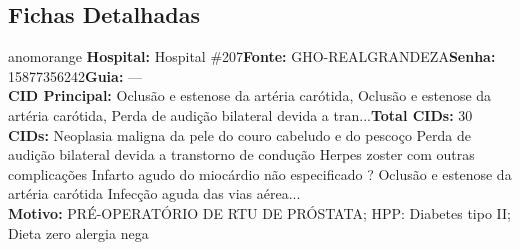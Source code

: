 \documentclass[a4paper,10pt]{article}
\begin{document}
\subsection{Fichas Detalhadas}
\begin{anomalycard}[Interna\c{c}\~{a}o \#11960 | Pac. \#8588 | ALTO (z=4.44) | LOS: 2d | 25/02/2026\,$\to$\,27/02/2026]{anomorange}
\textbf{Hospital:} Hospital \#207\quad \textbf{Fonte:} GHO-REALGRANDEZA\quad \textbf{Senha:} 15877356242\quad \textbf{Guia:} ---\\

\textbf{CID Principal:} {\small Oclusão e estenose da artéria carótida, Oclusão e estenose da artéria carótida, Perda de audição bilateral devida a tran...}\quad\textbf{Total CIDs:} 30\\

\textbf{CIDs:} {\scriptsize Neoplasia maligna da pele do couro cabeludo e do pescoço \textbar{} Perda de audição bilateral devida a transtorno de condução \textbar{} Herpes zoster com outras complicações \textbar{} Infarto agudo do miocárdio não especificado \textbar{} ? \textbar{} Oclusão e estenose da artéria carótida \textbar{} Infecção aguda das vias aérea...}\\

\textbf{Motivo:} {\scriptsize PRÉ-OPERATÓRIO DE RTU DE PRÓSTATA; HPP: Diabetes tipo II; Dieta zero alergia nega}\\

\end{anomalycard}
\end{document}
